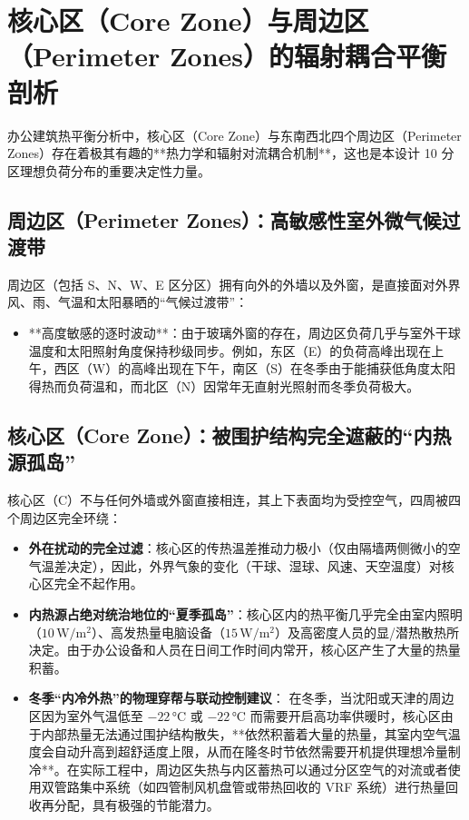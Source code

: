 \documentclass[11pt,a4paper]{article}
\begin{document}
\section{核心区（Core Zone）与周边区（Perimeter Zones）的辐射耦合平衡剖析}

办公建筑热平衡分析中，核心区（Core Zone）与东南西北四个周边区（Perimeter Zones）存在着极其有趣的**热力学和辐射对流耦合机制**，这也是本设计 10 分区理想负荷分布的重要决定性力量。

\subsection{周边区（Perimeter Zones）：高敏感性室外微气候过渡带}
周边区（包括 S、N、W、E 区分区）拥有向外的外墙以及外窗，是直接面对外界风、雨、气温和太阳暴晒的“气候过渡带”：
\begin{itemize}
    \item **高度敏感的逐时波动**：由于玻璃外窗的存在，周边区负荷几乎与室外干球温度和太阳照射角度保持秒级同步。例如，东区（E）的负荷高峰出现在上午，西区（W）的高峰出现在下午，南区（S）在冬季由于能捕获低角度太阳得热而负荷温和，而北区（N）因常年无直射光照射而冬季负荷极大。
\end{itemize}

\subsection{核心区（Core Zone）：被围护结构完全遮蔽的“内热源孤岛”}
核心区（C）不与任何外墙或外窗直接相连，其上下表面均为受控空气，四周被四个周边区完全环绕：
\begin{itemize}
    \item \textbf{外在扰动的完全过滤}：核心区的传热温差推动力极小（仅由隔墙两侧微小的空气温差决定），因此，外界气象的变化（干球、湿球、风速、天空温度）对核心区完全不起作用。
    \item \textbf{内热源占绝对统治地位的“夏季孤岛”}：核心区内的热平衡几乎完全由室内照明（$10\,\mathrm{W/m^2}$）、高发热量电脑设备（$15\,\mathrm{W/m^2}$）及高密度人员的显/潜热散热所决定。由于办公设备和人员在日间工作时间内常开，核心区产生了大量的热量积蓄。
    \item \textbf{冬季“内冷外热”的物理穿帮与联动控制建议}：
    在冬季，当沈阳或天津的周边区因为室外气温低至 $-22\,\si{\degreeCelsius}$ 或 $-22\,\si{\degreeCelsius}$ 而需要开启高功率供暖时，核心区由于内部热量无法通过围护结构散失，**依然积蓄着大量的热量，其室内空气温度会自动升高到超舒适度上限，从而在隆冬时节依然需要开机提供理想冷量制冷**。在实际工程中，周边区失热与内区蓄热可以通过分区空气的对流或者使用双管路集中系统（如四管制风机盘管或带热回收的 VRF 系统）进行热量回收再分配，具有极强的节能潜力。
\end{itemize}
\end{document}
